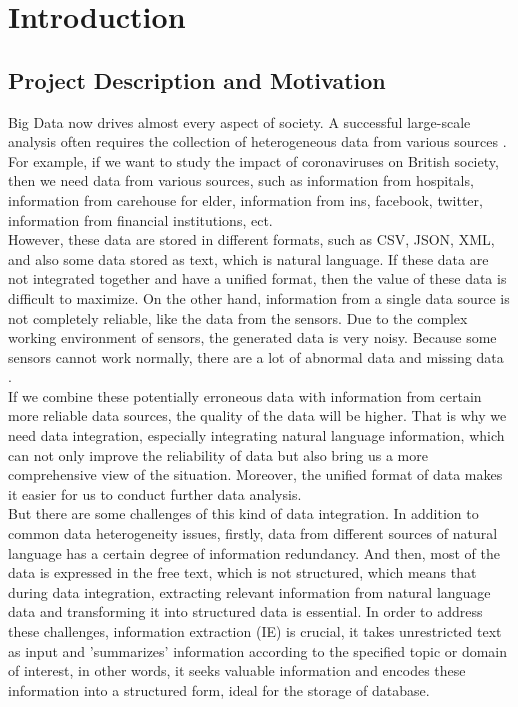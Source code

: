\chapter{Introduction}
\label{cha:intro}
\section{Project Description and Motivation }
\qquad Big Data now drives almost every aspect of society. A successful large-scale analysis often requires the collection of heterogeneous data from various sources \cite{jagadish2014big}. For example, if we want to study the impact of coronaviruses on British society, then we need data from various sources, such as information from hospitals, information from carehouse for elder, information from ins, facebook, twitter, information from financial institutions, ect. \\

However, these data are stored in different formats, such as CSV, JSON, XML, and also some data stored as text, which is natural language. If these data are not integrated together and have a unified format, then the value of these data is difficult to maximize. On the other hand, information from a single data source is not completely reliable, like the data from the sensors. Due to the complex working environment of sensors, the generated data is very noisy. Because some sensors cannot work normally, there are a lot of abnormal data and missing data \cite{lopes2010traffic}.\\

If we combine these potentially erroneous data with information from certain more reliable data sources, the quality of the data will be higher. That is why we need data integration, especially integrating natural language information, which can not only improve the reliability of data but also bring us a more comprehensive view of the situation. Moreover, the unified format of data makes it easier for us to conduct further data analysis.\\

But there are some challenges of this kind of data integration. In addition to common data heterogeneity issues, firstly, data from different sources of natural language has a certain degree of information redundancy. And then, most of the data is expressed in the free text, which is not structured, which means that during data integration, extracting relevant information from natural language data and transforming it into structured data is essential. In order to address these challenges, information extraction (IE) is crucial, it takes unrestricted text as input and 'summarizes' information according to the specified topic or domain of interest, in other words, it seeks valuable information and encodes these information into a structured form, ideal for the storage of database.\\


